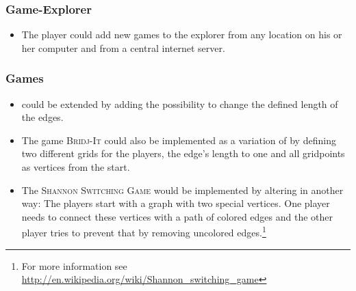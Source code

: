 \subsubsection{Game-Explorer}
\begin{itemize}

	\item The player could add new games to the explorer from any location on his or her computer and from a central internet server.

\end{itemize}

\subsubsection{Games}
\begin{itemize}
	\item \twixt could be extended by adding the possibility to change the defined length of the edges.
	\item The game \textsc{Bridj-It} could also be implemented as a variation of \twixt by defining two different grids for the players, the edge's length to one and all gridpoints as vertices from the start. 
	\item The \textsc{Shannon Switching Game} would be implemented by altering \twixt in another way: The players start with a graph with two special vertices. One player needs to connect these vertices with a path of colored edges and the other player tries to prevent that by removing uncolored edges.\footnote{For more information see \url{http://en.wikipedia.org/wiki/Shannon_switching_game}}
\end{itemize}